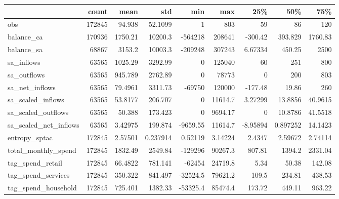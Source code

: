 \begin{tabular}{lrrrrrrrr}
\toprule
                         &   count &       mean &          std &           min &          max &        25\% &         50\% &        75\% \\
\midrule
 obs                     &  172845 &   94.938   &    52.1099   &       1       &    803       &   59       &   86        &  120       \\
 balance\_ca              &  170936 & 1750.21    & 10200.3      & -564218       & 208641       & -300.42    &  393.829    & 1760.83    \\
 balance\_sa              &   68867 & 3153.2     & 10003.3      & -209248       & 307243       &    6.67334 &  450.25     & 2500       \\
 sa\_inflows              &   63565 & 1025.29    &  3292.99     &       0       & 125040       &   60       &  251        &  800       \\
 sa\_outflows             &   63565 &  945.789   &  2762.89     &       0       &  78773       &    0       &  200        &  803       \\
 sa\_net\_inflows          &   63565 &   79.4961  &  3311.73     &  -69750       & 120000       & -177.48    &   19.86     &  260       \\
 sa\_scaled\_inflows       &   63565 &   53.8177  &   206.707    &       0       &  11614.7     &    3.27299 &   13.8856   &   40.9615  \\
 sa\_scaled\_outflows      &   63565 &   50.388   &   173.423    &       0       &   9694.17    &    0       &   10.8786   &   41.5518  \\
 sa\_scaled\_net\_inflows   &   63565 &    3.42975 &   199.874    &   -9659.55    &  11614.7     &   -8.95894 &    0.897252 &   14.1423  \\
 entropy\_sptac           &  172845 &    2.57501 &     0.237914 &       0.52119 &      3.14224 &    2.4347  &    2.59672  &    2.74114 \\
 total\_monthly\_spend     &  172845 & 1832.49    &  2549.84     & -129296       &  90267.3     &  807.81    & 1394.2      & 2331.04    \\
 tag\_spend\_retail        &  172845 &   66.4822  &   781.141    &  -62454       &  24719.8     &    5.34    &   50.38     &  142.08    \\
 tag\_spend\_services      &  172845 &  350.322   &   841.497    &  -32524.5     &  79621.2     &  109.5     &  234.81     &  438.53    \\
 tag\_spend\_household     &  172845 &  725.401   &  1382.33     &  -53325.4     &  85474.4     &  173.72    &  449.11     &  963.22    \\

\end{tabular}
